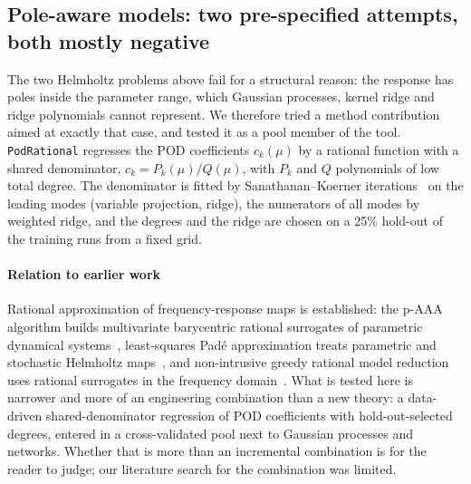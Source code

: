 \subsection{Pole-aware models: two pre-specified attempts, both mostly negative}\label{sec:rational}
The two Helmholtz problems above fail for a structural reason: the response has poles inside the parameter range, which Gaussian processes, kernel ridge and ridge polynomials cannot represent. We therefore tried a method contribution aimed at exactly that case, and tested it as a pool member of the tool. \texttt{PodRational} regresses the POD coefficients $c_k(\mu)$ by a rational function with a shared denominator, $c_k=P_k(\mu)/Q(\mu)$, with $P_k$ and $Q$ polynomials of low total degree. The denominator is fitted by Sanathanan--Koerner iterations~\cite{sanathanan1963} on the leading modes (variable projection, ridge), the numerators of all modes by weighted ridge, and the degrees and the ridge are chosen on a 25\% hold-out of the training runs from a fixed grid.
\paragraph{Relation to earlier work} Rational approximation of frequency-response maps is established: the p-AAA algorithm builds multivariate barycentric rational surrogates of parametric dynamical systems~\cite{carracedo2023}, least-squares Pad\'e approximation treats parametric and stochastic Helmholtz maps~\cite{bonizzoni2020}, and non-intrusive greedy rational model reduction uses rational surrogates in the frequency domain~\cite{nobile2021}. What is tested here is narrower and more of an engineering combination than a new theory: a data-driven shared-denominator regression of POD coefficients with hold-out-selected degrees, entered in a cross-validated pool next to Gaussian processes and networks. Whether that is more than an incremental combination is for the reader to judge; our literature search for the combination was limited.
